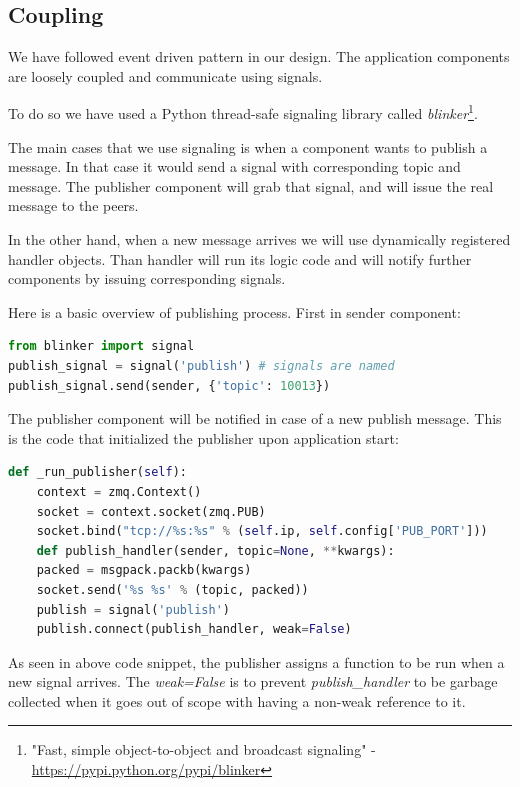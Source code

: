 \subsection{Coupling}
We have followed event driven pattern in our design.
The application components are loosely coupled and communicate using signals.

To do so we have used a Python thread-safe signaling library 
called \textit{blinker}\footnote{"Fast, simple object-to-object and broadcast signaling" -
\url{https://pypi.python.org/pypi/blinker}}.

The main cases that we use signaling is when a component wants to publish a message. 
In that case it would send a signal with corresponding topic and message. 
The publisher component will grab that signal, and will issue the real message to the peers.

In the other hand, when a new message arrives we will use dynamically registered handler objects.
Than handler will run its logic code and will notify further components by issuing corresponding signals.

Here is a basic overview of publishing process. First in sender component:

\begin{lstlisting}[language=python, caption={Publishing an internal signal with blinker}]
from blinker import signal
publish_signal = signal('publish') # signals are named
publish_signal.send(sender, {'topic': 10013})
\end{lstlisting}

The publisher component will be notified in case of a new publish message. 
This is the code that initialized the publisher upon application start:

\begin{lstlisting}[language=python, caption={Initializing the publisher upon application start}]
def _run_publisher(self):
    context = zmq.Context()
    socket = context.socket(zmq.PUB)
    socket.bind("tcp://%s:%s" % (self.ip, self.config['PUB_PORT']))
    def publish_handler(sender, topic=None, **kwargs):
	packed = msgpack.packb(kwargs)
	socket.send('%s %s' % (topic, packed))
    publish = signal('publish')
    publish.connect(publish_handler, weak=False)
\end{lstlisting}

As seen in above code snippet, the publisher assigns a function to be run when
a new signal arrives. The \textit{weak=False} is to prevent \textit{publish\_handler}
to be garbage collected when it goes out of scope with having a non-weak reference to it.

